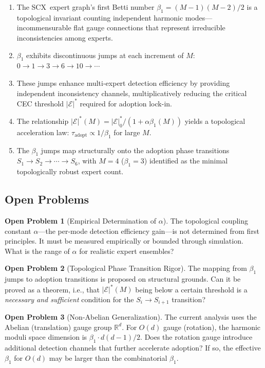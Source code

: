 \documentclass[12pt,a4paper]{article}
\theoremstyle{definition}
\newtheorem{problem}{Open Problem}[section]
\theoremstyle{remark}
\theoremstyle{definition}
\newcommand{\R}{\mathbb{R}}
\newcommand{\CEC}{\mathcal{E}}
\newcommand{\SCX}{\textsf{SCX}}
\newcommand{\CECstar}{|\CEC|^*}
\begin{document}
\begin{enumerate}[nosep]
  \item The \SCX\ expert graph's first Betti number $\beta_1 = (M-1)(M-2)/2$ is a topological invariant counting independent harmonic modes---incommensurable flat gauge connections that represent irreducible inconsistencies among experts.
  \item $\beta_1$ exhibits discontinuous jumps at each increment of $M$: $0 \to 1 \to 3 \to 6 \to 10 \to \cdots$
  \item These jumps enhance multi-expert detection efficiency by providing independent inconsistency channels, multiplicatively reducing the critical CEC threshold $\CECstar$ required for adoption lock-in.
  \item The relationship $\CECstar(M) = \CECstar_0/(1 + \alpha\beta_1(M))$ yields a topological acceleration law: $\tau_{\text{adopt}} \propto 1/\beta_1$ for large $M$.
  \item The $\beta_1$ jumps map structurally onto the adoption phase transitions $S_1 \to S_2 \to \cdots \to S_6$, with $M=4$ ($\beta_1=3$) identified as the minimal topologically robust expert count.
\end{enumerate}

\subsection{Open Problems}

\begin{problem}[Empirical Determination of $\alpha$]
  The topological coupling constant $\alpha$---the per-mode detection efficiency gain---is not determined from first principles. It must be measured empirically or bounded through simulation. What is the range of $\alpha$ for realistic expert ensembles?
\end{problem}

\begin{problem}[Topological Phase Transition Rigor]
  The mapping from $\beta_1$ jumps to adoption transitions is proposed on structural grounds. Can it be proved as a theorem, i.e., that $\CECstar(M)$ being below a certain threshold is a \emph{necessary and sufficient} condition for the $S_i \to S_{i+1}$ transition?
\end{problem}

\begin{problem}[Non-Abelian Generalization]
  The current analysis uses the Abelian (translation) gauge group $\R^d$. For $O(d)$ gauge (rotation), the harmonic moduli space dimension is $\beta_1 \cdot d(d-1)/2$. Does the rotation gauge introduce additional detection channels that further accelerate adoption? If so, the effective $\beta_1$ for $O(d)$ may be larger than the combinatorial $\beta_1$.
\end{problem}
\end{document}
